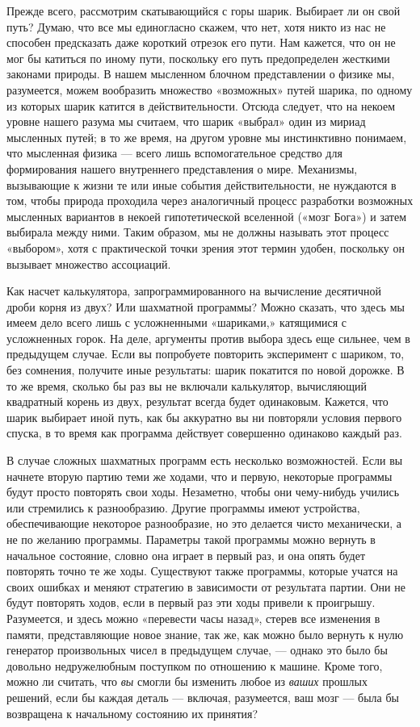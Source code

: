 Прежде всего, рассмотрим скатывающийся с горы шарик. Выбирает ли он свой путь? Думаю, что все мы единогласно скажем, что нет, хотя никто из нас не способен предсказать даже короткий отрезок его пути. Нам кажется, что он не мог бы катиться по иному пути, поскольку его путь предопределен жесткими законами природы. В нашем мысленном блочном представлении о физике мы, разумеется, можем вообразить множество «возможных» путей шарика, по одному из которых шарик катится в действительности. Отсюда следует, что на некоем уровне нашего разума мы считаем, что шарик «выбрал» один из мириад мысленных путей; в то же время, на другом уровне мы инстинктивно понимаем, что мысленная физика --- всего лишь вспомогательное средство для формирования нашего внутреннего представления о мире. Механизмы, вызывающие к жизни те или иные события действительности, не нуждаются в том, чтобы природа проходила через аналогичный процесс разработки возможных мысленных вариантов в некоей гипотетической вселенной («мозг Бога») и затем выбирала между ними. Таким образом, мы не должны называть этот процесс «выбором», хотя с практической точки зрения этот термин удобен, поскольку он вызывает множество ассоциаций.

Как насчет калькулятора, запрограммированного на вычисление десятичной дроби корня из двух? Или шахматной программы? Можно сказать, что здесь мы имеем дело всего лишь с усложненными «шариками,» катящимися с усложненных горок. На деле, аргументы против выбора здесь еще сильнее, чем в предыдущем случае. Если вы попробуете повторить эксперимент с шариком, то, без сомнения, получите иные результаты: шарик покатится по новой дорожке. В то же время, сколько бы раз вы не включали калькулятор, вычисляющий квадратный корень из двух, результат всегда будет одинаковым. Кажется, что шарик выбирает иной путь, как бы аккуратно вы ни повторяли условия первого спуска, в то время как программа действует совершенно одинаково каждый раз.

В случае сложных шахматных программ есть несколько возможностей. Если вы начнете вторую партию теми же ходами, что и первую, некоторые программы будут просто повторять свои ходы. Незаметно, чтобы они чему-нибудь учились или стремились к разнообразию. Другие программы имеют устройства, обеспечивающие некоторое разнообразие, но это делается чисто механически, а не по желанию программы. Параметры такой программы можно вернуть в начальное состояние, словно она играет в первый раз, и она опять будет повторять точно те же ходы. Существуют также программы, которые учатся на своих ошибках и меняют стратегию в зависимости от результата партии. Они не будут повторять ходов, если в первый раз эти ходы привели к проигрышу. Разумеется, и здесь можно «перевести часы назад», стерев все изменения в памяти, представляющие новое знание, так же, как можно было вернуть к нулю генератор произвольных чисел в предыдущем случае, --- однако это было бы довольно недружелюбным поступком по отношению к машине. Кроме того, можно ли считать, что \emph{вы} смогли бы изменить любое из \emph{ваших} прошлых решений, если бы каждая деталь --- включая, разумеется, ваш мозг --- была бы возвращена к начальному состоянию их принятия?

